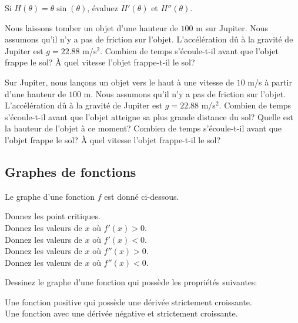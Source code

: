 \begin{question}[\life \eng]
Si $H(\theta) = \theta \sin(\theta)$, évaluez $H'(\theta)$ et $H''(\theta)$.
\label{6Q2}
\end{question}

\begin{question}
Nous laissons tomber un objet d'une hauteur de $100$ m sur Jupiter.  Nous
assumons qu'il n'y a pas de friction sur l'objet.  L'accélération dû à
la gravité de Jupiter est $g = 22.88$ m/s$^2$.  Combien de temps
s'écoule-t-il avant que l'objet frappe le sol?  À quel vitesse l'objet
frappe-t-il le sol? 
\label{6Q3}
\end{question}

\begin{question}
Sur Jupiter, nous lançons un objet vers le haut à une vitesse de $10$ m/s
à partir d'une hauteur de $100$ m.  Nous assumons qu'il n'y a pas de
friction sur l'objet.  L'accélération dû à la gravité de Jupiter est
$g = 22.88$ m/s$^2$. Combien de temps s'écoule-t-il avant que l'objet
atteigne sa plus grande distance du sol?  Quelle est la hauteur de
l'objet à ce moment?  Combien de temps s'écoule-t-il avant que l'objet
frappe le sol?  À quel vitesse l'objet frappe-t-il le sol?
\label{6Q4}
\end{question}

\subsection{Graphes de fonctions}

\begin{question}
Le graphe d'une fonction $f$ est donné ci-dessous.

 Donnez les point critiques.\\
 Donnez les valeurs de $x$ où $f'(x)>0$.\\
 Donnez les valeurs de $x$ où $f'(x)<0$.\\
 Donnez les valeurs de $x$ où $f''(x)>0$.\\
 Donnez les valeurs de $x$ où $f''(x)<0$.
\label{6Q5}
\end{question}

\begin{question}
Dessinez le graphe d'une fonction qui possède les propriétés suivantes:

 Une fonction positive qui possède une dérivée strictement
croissante.\\
 Une fonction avec une dérivée négative et strictement croissante.
\label{6Q6}
\end{question}

